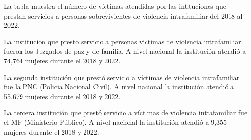 La tabla muestra el número de víctimas atendidas por las intituciones que prestan servicios a personas sobrevivientes de violencia intrafamiliar del 2018 al 2022. 

La institución que prestó servicio a personas víctimas de violencia intrafamiliar fueron los Juzgados de paz y de familia. A nivel nacional la institución atendió a 74,764 mujeres durante el 2018 y 2022.

La segunda institución que prestó servicio a víctimas de violencia intrafamiliar fue la PNC (Policia Nacional Civil). A nivel nacional la institución atendió a 55,679 mujeres durante el 2018 y 2022.

La tercera institución que prestó servicio a víctimas de violencia intrafamiliar fue el MP (Ministerio Público). A nivel nacional la institución atendió a 9,355 mujeres durante el 2018 y 2022.